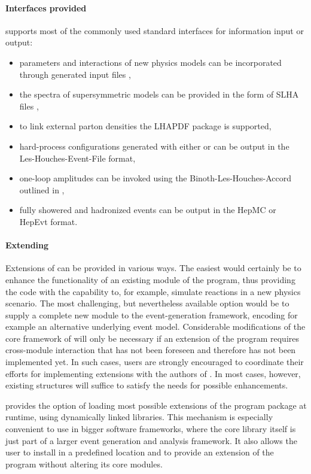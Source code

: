 \paragraph{Interfaces provided}
\Sherpa supports most of the commonly used standard interfaces for information input or output:
\begin{itemize}
\item parameters and interactions of new physics models can be 
incorporated through \FeynRules generated input files \cite{Christensen:2009jx},
\item the spectra of supersymmetric models can be provided in the form of 
SLHA files \cite{Skands:2003cj,Allanach:2008qq},
\item to link external parton densities the LHAPDF package is supported,
\item hard-process configurations generated with either \Amegic or \Comix 
can be output in the Les-Houches-Event-File format,
\item one-loop amplitudes can be invoked using the Binoth-Les-Houches-Accord 
outlined in \cite{Binoth:2010xt},
\item fully showered and hadronized events can be output in the HepMC 
\cite{Dobbs:2001ck} or HepEvt format. 
\end{itemize}

\paragraph{Extending \Sherpa}
Extensions of \Sherpa can be provided in various ways. 
The easiest would certainly be to enhance the functionality of
an existing module of the program, thus providing the code with
the capability to, for example, simulate reactions in a new physics
scenario. The most challenging, but nevertheless available option
would be to supply a complete new module to the event-generation
framework, encoding for example an alternative underlying event 
model. Considerable modifications of the core framework of \Sherpa
will only be necessary if an extension of the program requires 
cross-module interaction that has not been foreseen and therefore
has not been implemented yet. In such cases, users are strongly 
encouraged to coordinate their efforts for implementing extensions
with the authors of \Sherpa. In most cases, however, existing 
structures will suffice to satisfy the needs for possible enhancements.

\Sherpa provides the option of loading most possible extensions of the
program package at runtime, using dynamically linked libraries.
This mechanism is especially convenient to use in bigger software
frameworks, where the \Sherpa core library itself is just part of
a larger event generation and analysis framework. It also allows
the user to install \Sherpa in a predefined location and to provide an 
extension of the program without altering its core modules.

